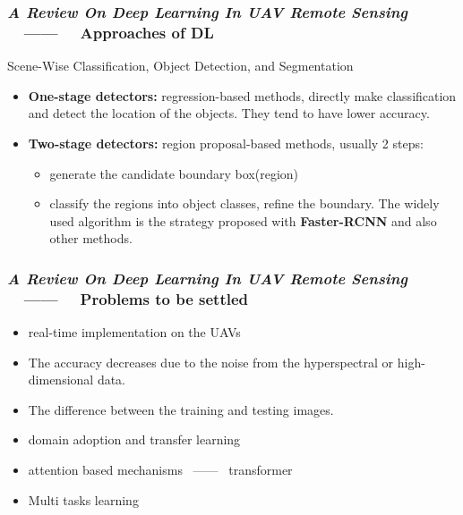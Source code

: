 \begin{frame}
    \frametitle{\textit{A Review On Deep Learning In UAV Remote Sensing}
    ~~------~~ Approaches of DL}

    \begin{block}{Scene-Wise Classification, Object Detection, and Segmentation}
    \end{block}
    \begin{itemize}
        \item \textbf{One-stage detectors:}\linebreak
            regression-based methods, directly make classification and detect
            the location of the objects. They tend to have lower accuracy.
        \item \textbf{Two-stage detectors:}\linebreak
            region proposal-based methods, usually 2 steps: \linebreak
            \begin{itemize}
                \item generate the candidate boundary box(region)
                \item classify the regions into object classes, refine the
                    boundary.
            The widely used algorithm is the strategy proposed with
            \textbf{Faster-RCNN} and also other methods.
            \end{itemize}
    \end{itemize}

\end{frame}


\begin{frame}
    \frametitle{\textit{A Review On Deep Learning In UAV Remote Sensing}
    ~~------~~ Problems to be settled}

    \begin{itemize}
        \item real-time implementation on the UAVs
        \item The accuracy decreases due to the noise from the hyperspectral or
            high-dimensional data.
        \item The difference between the training and testing images.
        \item domain adoption and transfer learning
        \item attention based mechanisms ~------~ transformer
        \item Multi tasks learning
    \end{itemize}

\end{frame}
